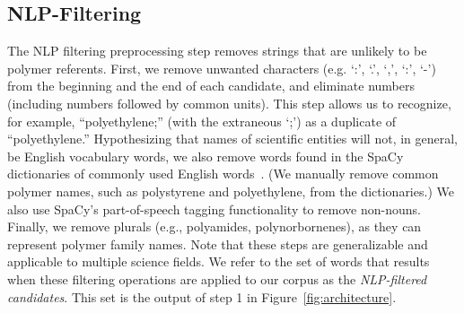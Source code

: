 \subsection{NLP-Filtering}\label{sec:filter}

The NLP filtering preprocessing step removes strings that are unlikely to be polymer referents. 
First, we remove
unwanted characters (e.g. `:', `.', `,', `:', `-') from the beginning and the end of each
candidate, and eliminate numbers (including numbers followed by common units).
This step allows us to recognize, for example, ``polyethylene;'' (with the extraneous `;') 
as a duplicate of ``polyethylene.'' 
Hypothesizing that names of scientific entities will not, in general, be English
vocabulary words, we also remove words found in the SpaCy dictionaries
of commonly used English words~\cite{choi2015depends}. (We manually remove common polymer
names, such as polystyrene and polyethylene, from the dictionaries.) 
We also use
SpaCy's part-of-speech tagging functionality to remove non-nouns.  
Finally, we remove plurals (e.g.,
polyamides, polynorbornenes), as they can represent polymer family names.
Note that these steps are generalizable and applicable to multiple science fields.
We refer to the set of words that results when these filtering operations are applied to our corpus 
as the \emph{NLP-filtered candidates}.
This set is the output of step 1 in Figure~\ref{fig:architecture}.


